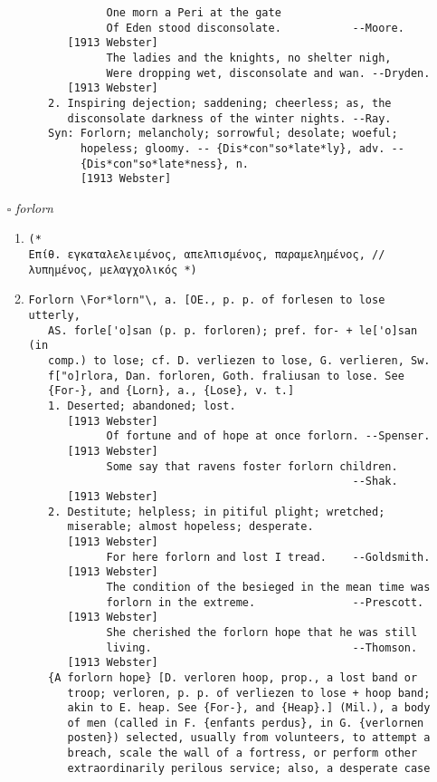 \documentclass{article}
\begin{document}
\begin{itemize}
\begin{enumerate}
{\begin{lstlisting}
            One morn a Peri at the gate
            Of Eden stood disconsolate.           --Moore.
      [1913 Webster]
            The ladies and the knights, no shelter nigh,
            Were dropping wet, disconsolate and wan. --Dryden.
      [1913 Webster]
   2. Inspiring dejection; saddening; cheerless; as, the
      disconsolate darkness of the winter nights. --Ray.
   Syn: Forlorn; melancholy; sorrowful; desolate; woeful;
        hopeless; gloomy. -- {Dis*con"so*late*ly}, adv. --
        {Dis*con"so*late*ness}, n.
        [1913 Webster]
\end{lstlisting}}
\end{enumerate}
\item[$\square$] \emph{ forlorn }
\begin{enumerate}
\item{
\begin{lstlisting}
(* 
Επίθ. εγκαταλελειμένος, απελπισμένος, παραμελημένος, // λυπημένος, μελαγχολικός *)
\end{lstlisting}}
\item{
\begin{lstlisting}
Forlorn \For*lorn"\, a. [OE., p. p. of forlesen to lose utterly,
   AS. forle['o]san (p. p. forloren); pref. for- + le['o]san (in
   comp.) to lose; cf. D. verliezen to lose, G. verlieren, Sw.
   f["o]rlora, Dan. forloren, Goth. fraliusan to lose. See
   {For-}, and {Lorn}, a., {Lose}, v. t.]
   1. Deserted; abandoned; lost.
      [1913 Webster]
            Of fortune and of hope at once forlorn. --Spenser.
      [1913 Webster]
            Some say that ravens foster forlorn children.
                                                  --Shak.
      [1913 Webster]
   2. Destitute; helpless; in pitiful plight; wretched;
      miserable; almost hopeless; desperate.
      [1913 Webster]
            For here forlorn and lost I tread.    --Goldsmith.
      [1913 Webster]
            The condition of the besieged in the mean time was
            forlorn in the extreme.               --Prescott.
      [1913 Webster]
            She cherished the forlorn hope that he was still
            living.                               --Thomson.
      [1913 Webster]
   {A forlorn hope} [D. verloren hoop, prop., a lost band or
      troop; verloren, p. p. of verliezen to lose + hoop band;
      akin to E. heap. See {For-}, and {Heap}.] (Mil.), a body
      of men (called in F. {enfants perdus}, in G. {verlornen
      posten}) selected, usually from volunteers, to attempt a
      breach, scale the wall of a fortress, or perform other
      extraordinarily perilous service; also, a desperate case

\end{lstlisting}}
\end{enumerate}
\end{itemize}
\end{document}
